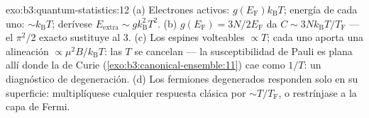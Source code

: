 \begin{solution}{exo:b3:quantum-statistics:12}
(a) Electrones activos: $g(E_{\text{F}})k_{\text{B}}T$; energía de cada uno:
$\sim k_{\text{B}}T$; derívese $E_{\text{extra}} \sim
g k_{\text{B}}^2T^2$. (b) $g(E_{\text{F}}) = 3N/2E_{\text{F}}$
da $C \sim 3Nk_{\text{B}}T/T_{\text{F}}$ --- el
$\pi^2/2$ exacto sustituye al 3. (c) Los espines volteables $\propto T$; cada uno
aporta una alineación $\propto \mu^2B/k_{\text{B}}T$: las $T$ se
cancelan --- la susceptibilidad de Pauli es plana allí donde la de Curie
(\cref{exo:b3:canonical-ensemble:11}) cae como $1/T$: un
diagnóstico de degeneración. (d) Los fermiones degenerados responden solo en
su superficie: multiplíquese cualquier respuesta clásica por $\sim
T/T_{\text{F}}$, o restrínjase a la capa de Fermi.
\end{solution}

